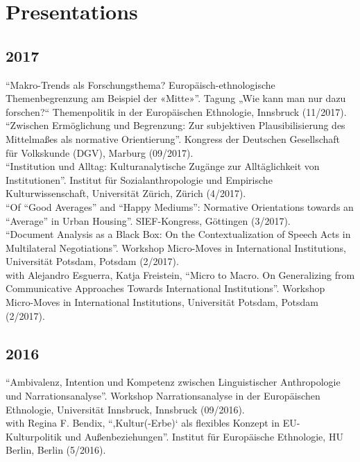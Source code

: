 \documentclass[11pt, a4paper]{article} %
\begin{document}
\section*{Presentations}
\subsection*{2017}
\enquote{Makro-Trends als Forschungsthema? Europäisch-ethnologische Themenbegrenzung am Beispiel der «Mitte»}. Tagung „Wie kann man nur dazu forschen?“ Themenpolitik in der Europäischen Ethnologie, Innsbruck (11/2017).\\[.25cm]
\enquote{Zwischen Ermöglichung und Begrenzung: Zur subjektiven Plausibilisierung des Mittelmaßes als normative Orientierung}. Kongress der Deutschen Gesellschaft für Volkskunde (DGV), Marburg (09/2017).\\[.25cm]
\enquote{Institution und Alltag: Kulturanalytische Zugänge zur Alltäglichkeit von Institutionen}. Institut für Sozialanthropologie und Empirische Kulturwissenschaft, Universität Zürich, Zürich (4/2017).\\[.25cm]
\enquote{Of “Good Averages” and “Happy Mediums”: Normative Orientations towards an “Average” in Urban Housing}. SIEF-Kongress, Göttingen (3/2017).\\[.25cm]
\enquote{Document Analysis as a Black Box: On the Contextualization of Speech Acts in Multilateral Negotiations}. Workshop Micro-Moves in International Institutions, Universität Potsdam, Potsdam (2/2017).\\[.25cm]
with Alejandro Esguerra, Katja Freistein, \enquote{Micro to Macro. On Generalizing from Communicative Approaches Towards International Institutions}. Workshop Micro-Moves in International Institutions, Universität Potsdam, Potsdam (2/2017).
\subsection*{2016}
\enquote{Ambivalenz, Intention und Kompetenz zwischen Linguistischer Anthropologie und Narrationsanalyse}. Workshop Narrationsanalyse in der Europäischen Ethnologie, Universität Innsbruck, Innsbruck (09/2016).\\[.25cm]
with Regina F. Bendix, \enquote{,Kultur(-Erbe)‘ als flexibles Konzept in EU-Kulturpolitik und Außenbeziehungen}. Institut für Europäische Ethnologie, HU Berlin, Berlin (5/2016).
\end{document}
